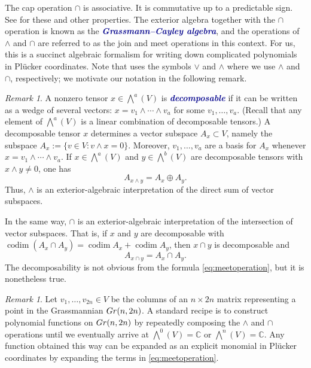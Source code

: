 \documentclass[10pt]{amsart}
\theoremstyle{definition}
\theoremstyle{plain}
\theoremstyle{plain}
\theoremstyle{definition}
\theoremstyle{remark}
\newtheorem{remark}[cdrthm]{Remark}
\theoremstyle{plain}
\theoremstyle{plain}
\theoremstyle{plain}
\numberwithin{equation}{section}
\DeclareMathOperator{\codim}{\mathrm{codim}}
\newcommand{\newword}[1]{\textcolor{darkblue}{\textbf{\emph{#1}}}}
\begin{document}
The cap operation $\cap$ is associative. It is commutative up to a predictable sign. See \cite[Chapter~3]{Sturmfels} for these and other properties. The exterior algebra together with the $\cap$ operation is known as the \newword{Grassmann--Cayley algebra}, and the operations of $\wedge$ and $\cap$ are referred to as the join and meet operations in this context. For us, this is a succinct algebraic formalism for writing down complicated polynomials in Pl\"ucker coordinates. Note that \cite{Sturmfels} uses the symbols $\vee$ and $\wedge$ where we use $\wedge$ and $\cap$, respectively; we motivate our notation in the following remark.

\begin{remark} 
A nonzero tensor $x \in \bigwedge^a(V)$ is \newword{decomposable} if it can be written as a wedge of several vectors: $x = v_1 \wedge \cdots \wedge v_a$ for some $v_1,\dots,v_a$. (Recall that any element of $\bigwedge^a(V)$ is a linear combination of decomposable tensors.) A decomposable tensor $x$ determines a vector subspace $A_x \subset V$, namely the subspace $A_x := \{v \in V \colon v \wedge x = 0\}$. Moreover, $v_1,\dots,v_a$ are a basis for $A_x$ whenever $x = v_1 \wedge \cdots \wedge v_a$. If $x \in \bigwedge^a(V)$ and $y \in \bigwedge^b(V)$ are decomposable tensors with $x \wedge y \neq 0$, one has 
$$A_{x \wedge y} = A_x \oplus A_y.$$
Thus, $\wedge$ is an exterior-algebraic interpretation of the direct sum of vector subspaces. 

In the same way, $\cap$ is an exterior-algebraic interpretation of the intersection of vector subspaces. That is, if $x$ and $y$ are decomposable with $\codim(A_x \cap A_y) = \codim A_x + \codim A_y$, then $x \cap y$ is decomposable and 
\[A_{x \cap y} = A_x \cap A_y.\]
The decomposability is not obvious from the formula \eqref{eq:meetoperation}, but it is nonetheless true. 
\end{remark}
 

\begin{remark}\label{rmk:cookingwithGC}
Let $v_1,\dots,v_{2n} \in V$ be the columns of an $n \times 2n$ matrix representing a point in the Grassmannian ${\rm Gr}(n,2n)$. A standard recipe is to construct polynomial functions on ${\rm Gr}(n,2n)$ by repeatedly composing the $\wedge$ and $\cap$ operations until we eventually arrive at $\bigwedge^0(V) = \mathbb{C}$ or $\bigwedge^n(V) = \mathbb{C}$. Any function obtained this way can be expanded as an explicit monomial in Pl\"ucker coordinates by expanding the terms in \eqref{eq:meetoperation}.
\end{remark}
\end{document}

